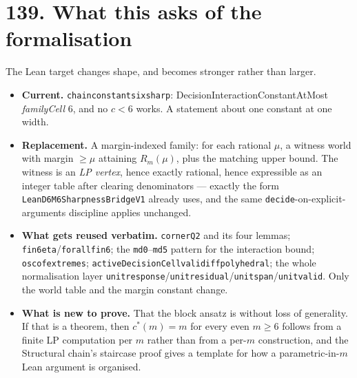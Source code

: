 \documentclass[9pt,twocolumn]{article}
\renewcommand{\_}{\CIGunderscore\allowbreak}
\begin{document}
\section*{139. What this asks of the formalisation}
The Lean target changes shape, and becomes stronger rather than larger.
\begin{itemize}
\item \textbf{Current.} \texttt{chain\_constant\_six\_sharp}: \textsf{DecisionInteractionConstantAtMost} \textit{familyCell} $6$, and no $c<6$ works. A statement about one constant at one width.
\item \textbf{Replacement.} A margin-indexed family: for each rational $\mu$, a witness world with margin $\ge\mu$ attaining $R_m(\mu)$, plus the matching upper bound. The witness is an \emph{LP vertex}, hence exactly rational, hence expressible as an integer table after clearing denominators --- exactly the form \texttt{LeanD6M6SharpnessBridgeV1} already uses, and the same \texttt{decide}-on-explicit-arguments discipline applies unchanged.
\item \textbf{What gets reused verbatim.} \texttt{cornerQ2} and its four lemmas; \texttt{fin6\_eta}/\texttt{forall\_fin6}; the \texttt{md0}--\texttt{md5} pattern for the interaction bound; \texttt{osc\_of\_extremes}; \texttt{activeDecisionCell\_valid\_iff\_polyhedral}; the whole normalisation layer \texttt{unit\_response}/\texttt{unit\_residual}/\texttt{unit\_span}/\texttt{unit\_valid}. Only the world table and the margin constant change.
\item \textbf{What is new to prove.} That the block ansatz is without loss of generality. If that is a theorem, then $c^\ast(m)=m$ for every even $m\ge6$ follows from a finite LP computation per $m$ rather than from a per-$m$ construction, and the Structural chain's staircase proof gives a template for how a parametric-in-$m$ Lean argument is organised.
\end{itemize}
\end{document}
